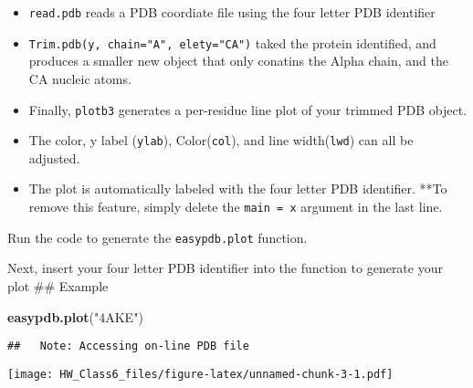 \documentclass[]{article}
\newenvironment{Shaded}{\begin{snugshade}}{\end{snugshade}}
\newcommand{\KeywordTok}[1]{\textcolor[rgb]{0.13,0.29,0.53}{\textbf{#1}}}
\newcommand{\DataTypeTok}[1]{\textcolor[rgb]{0.13,0.29,0.53}{#1}}
\newcommand{\DecValTok}[1]{\textcolor[rgb]{0.00,0.00,0.81}{#1}}
\newcommand{\StringTok}[1]{\textcolor[rgb]{0.31,0.60,0.02}{#1}}
\newcommand{\CommentTok}[1]{\textcolor[rgb]{0.56,0.35,0.01}{\textit{#1}}}
\newcommand{\ControlFlowTok}[1]{\textcolor[rgb]{0.13,0.29,0.53}{\textbf{#1}}}
\newcommand{\OperatorTok}[1]{\textcolor[rgb]{0.81,0.36,0.00}{\textbf{#1}}}
\newcommand{\NormalTok}[1]{#1}
\providecommand{\tightlist}{%
  \setlength{\itemsep}{0pt}\setlength{\parskip}{0pt}}
\begin{document}
\begin{Shaded}
\end{Shaded}

\begin{itemize}
\tightlist
\item
  \texttt{read.pdb} reads a PDB coordiate file using the four letter PDB
  identifier
\item
  \texttt{Trim.pdb(y,\ chain="A",\ elety="CA")} taked the protein
  identified, and produces a smaller new object that only conatins the
  Alpha chain, and the CA nucleic atoms.
\item
  Finally, \texttt{plotb3} generates a per-residue line plot of your
  trimmed PDB object.
\item
  The color, y label (\texttt{ylab}), Color(\texttt{col}), and line
  width(\texttt{lwd}) can all be adjusted.
\item
  The plot is automatically labeled with the four letter PDB identifier.
  **To remove this feature, simply delete the \texttt{main\ =\ x}
  argument in the last line.
\end{itemize}

Run the code to generate the \texttt{easypdb.plot} function.

Next, insert your four letter PDB identifier into the function to
generate your plot \#\# Example

\begin{Shaded}
\begin{Highlighting}[]
\KeywordTok{easypdb.plot}\NormalTok{(}\StringTok{"4AKE"}\NormalTok{)}
\end{Highlighting}
\end{Shaded}

\begin{verbatim}
##   Note: Accessing on-line PDB file
\end{verbatim}

\texttt{[image: HW\_Class6\_files/figure-latex/unnamed-chunk-3-1.pdf]}
\end{document}
